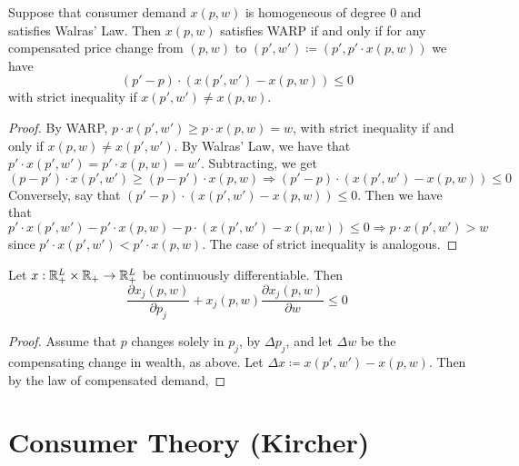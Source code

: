 \documentclass[12pt]{article}
\begin{document}
\begin{proposition}
	 Suppose that consumer demand $x(p,w)$ is homogeneous of degree 0 and satisfies Walras' Law. Then $x(p,w)$ satisfies WARP if and only if for any compensated price change from $(p,w)$ to $(p',w') \coloneqq (p',p' \cdot x(p,w))$ we have
	\[
	(p' - p)\cdot (x(p',w') - x(p,w)) \le 0
	\] 
	with strict inequality if $x(p',w') \ne x(p,w)$.
\end{proposition}
\begin{proof}
	By WARP, $p \cdot x(p',w') \ge p \cdot x(p,w) = w$, with strict inequality if and only if $x(p,w) \ne x(p',w')$. By Walras' Law, we have that $p'\cdot x(p',w') = p'\cdot x(p,w) = w'$. Subtracting, we get
	\[
	(p - p') \cdot x(p',w') \ge (p - p')\cdot x(p,w) \Longrightarrow (p' - p) \cdot (x(p',w') - x(p,w)) \le 0
	\]
	Conversely, say that $(p' - p) \cdot (x(p',w') - x(p,w)) \le 0$. Then we have that
	\[
	p' \cdot x(p',w') - p' \cdot x(p,w) - p \cdot (x(p',w') - x(p,w)) \le 0 \Longrightarrow p \cdot x(p',w') > w
	\]
	since $p' \cdot x(p',w') < p' \cdot x(p,w)$. The case of strict inequality is analogous.
\end{proof}

\begin{proposition}\label{prop:law_of_demand}
	Let $x : \mathbb{R}^L_+ \times \mathbb{R}_+ \to \mathbb{R}^L_+$ be continuously differentiable. Then
	\[
	\frac{\partial x_j(p,w)}{\partial p_j} + x_j(p,w) \frac{\partial x_j(p,w)}{\partial w} \le 0
	\]
\end{proposition}
\begin{proof}
	Assume that $p$ changes solely in $p_j$, by $\Delta p_j$, and let $\Delta w$ be the compensating change in wealth, as above. Let $\Delta x \coloneqq x(p',w') - x(p,w)$. Then by the law of compensated demand,
\end{proof}































\newpage
\section{Consumer Theory (Kircher)}\label{sec:kircher}
\end{document}
